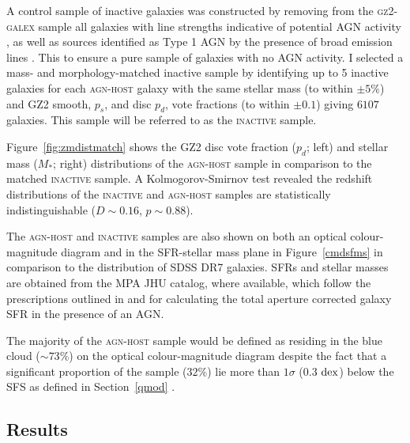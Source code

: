 A control sample of inactive galaxies was constructed by removing from the \textsc{gz2-galex} sample all galaxies with line strengths indicative of potential AGN activity \citep{kauffmann03b}, as well as sources identified as Type 1 AGN by the presence of broad emission lines \citep{Oh15}. This to ensure a pure sample of galaxies with no AGN activity. I selected a mass- and morphology-matched inactive sample by identifying up to 5 inactive galaxies for each \textsc{agn-host} galaxy with the same stellar mass (to within $\pm5\%$) and GZ2 smooth, $p_s$, and disc $p_d$,  vote fractions (to within $\pm 0.1$) giving $6107$ galaxies. This sample will be referred to as the \textsc{inactive} sample. 


Figure~\ref{fig:zmdistmatch} shows the GZ2 disc vote fraction ($p_d$; left) and stellar mass ($M_*$; right) distributions of the \textsc{agn-host} sample in comparison to the matched \textsc{inactive} sample. A Kolmogorov-Smirnov test revealed the redshift distributions of the \textsc{inactive} and \textsc{agn-host} samples are statistically indistinguishable ($D \sim 0.16$, $p \sim 0.88$). 

The \textsc{agn-host} and \textsc{inactive}  samples are also shown on both an optical colour-magnitude diagram and in the SFR-stellar mass plane in Figure~\ref{cmdsfms} in comparison to the distribution of SDSS DR7 galaxies. SFRs and stellar masses are obtained from the MPA JHU catalog, where available, which follow the prescriptions outlined in \cite{brinchmann04} and \cite{Salim07} for calculating the total aperture corrected galaxy SFR in the presence of an AGN. 

The majority of the \textsc{agn-host} sample would be defined as residing in the blue cloud ($\sim73\%$) on the optical colour-magnitude diagram despite the fact that a significant proportion of the sample ($32\%$) lie more than $1\sigma$ ($0.3$ $\rm{dex}$) below the SFS as defined in Section~\ref{qmod} \citep[][see Figure \ref{cmdsfms} and Table~\ref{table:agnqsubs}]{peng10}.

\subsection{Results}\label{results}

